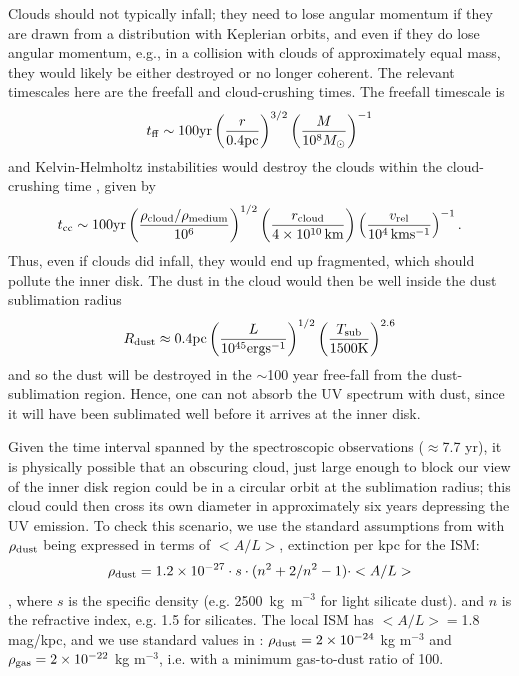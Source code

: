 \documentclass[a4paper,fleqn,usenatbib]{mnras}
\begin{document}
Clouds should not typically infall; they need to lose angular momentum
if they are drawn from a distribution with Keplerian orbits, and even
if they do lose angular momentum, e.g., in a collision with clouds of 
approximately equal mass, they would likely be either destroyed or no
longer coherent. The relevant timescales here are the freefall and
cloud-crushing times. The freefall timescale is 
\begin{equation}
    t_{{\rm ff}}   \sim 100   {\rm yr}  
                     \left( \frac{ r } {0.4\rm{pc} }\right)^{3/2} 
                                            \left(\frac{M}{10^{8}M_{\odot}}\right)^{-1}
\end{equation}
and Kelvin-Helmholtz instabilities would destroy the clouds within the
cloud-crushing time \citep[e.g., ][]{Nagakura2008, Hopkins2013,
Shiokawa2015, Bae2016}, given by
\begin{equation}
    t_{\rm cc} \sim 100{\rm yr} \left(\frac{\rho_{{\rm cloud}}/\rho_{{\rm medium}}} {10^{6}}\right)^{1/2} 
                                            \left(\frac{r_{\rm cloud}}{4 \times 10^{10} \, \rm{km}}\right) 
                                            \left(\frac{v_{\rm rel}}{10^{4} \, \rm{km s^{-1}}}\right)^{-1}.
\label{eqn:T_cloudcrushing}
\end{equation}
Thus, even if clouds did infall, they would end up fragmented, which
should pollute the inner disk.  The dust in the cloud would then be
well inside the dust sublimation radius 
\begin{equation}
    R_{\rm dust} \approx 0.4{\rm pc}\left(\frac{L}{10^{45}\rm{erg s^{-1}}}\right)^{1/2}
                                                   \left(\frac{T_{\rm sub}}{1500\rm{K}}\right)^{2.6}
\end{equation}
and so the dust will be destroyed in the $\sim$100 year free-fall from
the dust-sublimation region. Hence, one can not absorb the UV spectrum
with dust, since it will have been sublimated well before it arrives
at the inner disk.

 
Given the time interval spanned by the spectroscopic observations
($\approx$7.7 yr), it is physically possible that an obscuring cloud,
just large enough to block our view of the inner disk region could be
in a circular orbit at the sublimation radius; this cloud could then
cross its own diameter in approximately six years depressing the UV
emission. To check this scenario, we use the standard assumptions from
\citet{Whittet1992book} with $\rho_{\rm dust}$ being expressed in
terms of $<A/L>$, extinction per kpc for the ISM:
\begin{equation}
\rho_{\rm dust}= 1.2 \times 10^{-27} \cdot  s \cdot (n^2 + 2/n^2 -1) \cdot <A/L>  
\end{equation}
\citep[eqn. 3.30 in][]{Whittet1992book},  
where $s$ is the  specific density (e.g. 2500~kg~m$^{-3}$ for light silicate dust).
and $n$ is the refractive index, e.g. 1.5 for silicates.
The local ISM has $<A/L>=$1.8 mag/kpc, and we use 
standard values in \citet{Whittet1992book}:  
$\rho_{\rm dust} =2 \times 10^{-24}$ kg m$^{-3}$
and $\rho_{\rm gas}= 2 \times 10^{-22}$ kg m$^{-3}$, i.e. with 
a minimum gas-to-dust ratio of 100. 
\end{document}
